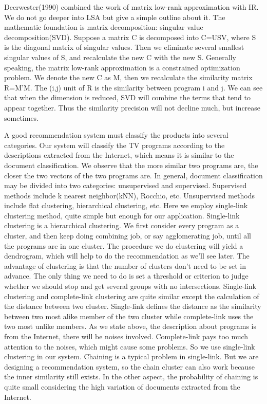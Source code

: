 Deerwester(1990) combined the work of matrix low-rank approximation with IR. We do not go deeper into LSA but give a simple outline about it. The mathematic foundation is matrix decomposition: singular value decomposition(SVD). Suppose a matrix C is decomposed into C=USV, where S is the diagonal matrix of singular values. Then we eliminate several smallest singular values of S, and recalculate the new C with the new S. Generally speaking, the matrix low-rank approximation is a constrained optimization problem. We denote the new C as M, then we recalculate the similarity matrix R=M'M. The (i,j) unit of R is the similarity between program i and j. We can see that when the dimension is reduced, SVD will combine the terms that tend to appear together. Thus the similarity precision will not decline much, but increase sometimes.

A good recommendation system must classify the products into several categories. Our system will classify the TV programs according to the descriptions extracted from the Internet, which means it is similar to the document classification. We observe that the more similar two programs are, the closer the two vectors of the two programs are. In general, document classification may be divided into two categories: unsupervised and supervised. Supervised methods include k nearest neighbor(kNN), Rocchio, etc. Unsupervised methods include flat clustering, hierarchical clustering, etc. Here we employ single-link clustering method, quite simple but enough for our application. Single-link clustering is a hierarchical clustering. We first consider every program as a cluster, and then keep doing combining job, or say agglomerating job, until all the programs are in one cluster. The procedure we do clustering will yield a dendrogram, which will help to do the recommendation as we'll see later. The advantage of clustering is that the number of clusters don't need to be set in advance. The only thing we need to do is set a threshold or criterion to judge whether we should stop and get several groups with no intersections. Single-link clustering and complete-link clustering are quite similar except the calculation of the distance between two cluster. Single-link defines the distance as the similarity between two most alike member of the two cluster while complete-link uses the two most unlike members. As we state above, the description about programs is from the Internet, there will be noises involved. Complete-link pays too much attention to the noises, which might cause some problems. So we use single-link clustering in our system. Chaining is a typical problem in single-link. But we are designing a recommendation system, so the chain cluster can also work because the inner similarity still exists. In the other aspect, the probability of chaining is quite small considering the high variation of documents extracted from the Internet.

